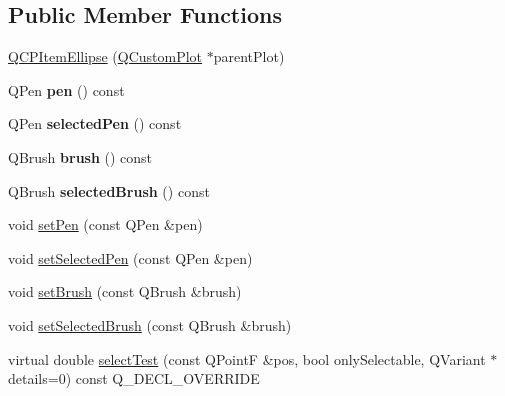 \subsection*{Public Member Functions}
\begin{DoxyCompactItemize}
\item 
\hyperlink{class_q_c_p_item_ellipse_a759b77ef002515eba0263b5447ecb3fb}{Q\+C\+P\+Item\+Ellipse} (\hyperlink{class_q_custom_plot}{Q\+Custom\+Plot} $\ast$parent\+Plot)
\item 
\mbox{\label{class_q_c_p_item_ellipse_a8288f7ce760fc795f5ce4e61136bda19}} 
Q\+Pen {\bfseries pen} () const
\item 
\mbox{\label{class_q_c_p_item_ellipse_a9a200af2797356b45479b601d75437ee}} 
Q\+Pen {\bfseries selected\+Pen} () const
\item 
\mbox{\label{class_q_c_p_item_ellipse_aacf45d032f204d0df3dd0bfdf1172cd3}} 
Q\+Brush {\bfseries brush} () const
\item 
\mbox{\label{class_q_c_p_item_ellipse_afeda9d8e2e6da216a3c3366d87e80feb}} 
Q\+Brush {\bfseries selected\+Brush} () const
\item 
void \hyperlink{class_q_c_p_item_ellipse_adb81a663ed2420fcfa011e49f678d1a6}{set\+Pen} (const Q\+Pen \&pen)
\item 
void \hyperlink{class_q_c_p_item_ellipse_a6c542fba1dc918041c583f58a50dde99}{set\+Selected\+Pen} (const Q\+Pen \&pen)
\item 
void \hyperlink{class_q_c_p_item_ellipse_a49fc74e6965834e873d027d026def798}{set\+Brush} (const Q\+Brush \&brush)
\item 
void \hyperlink{class_q_c_p_item_ellipse_a9693501cfaa43a099655c75bed0dab3f}{set\+Selected\+Brush} (const Q\+Brush \&brush)
\item 
virtual double \hyperlink{class_q_c_p_item_ellipse_ab6e2b8a29695c606c7731e498297ca29}{select\+Test} (const Q\+PointF \&pos, bool only\+Selectable, Q\+Variant $\ast$details=0) const Q\+\_\+\+D\+E\+C\+L\+\_\+\+O\+V\+E\+R\+R\+I\+DE
\end{DoxyCompactItemize}
